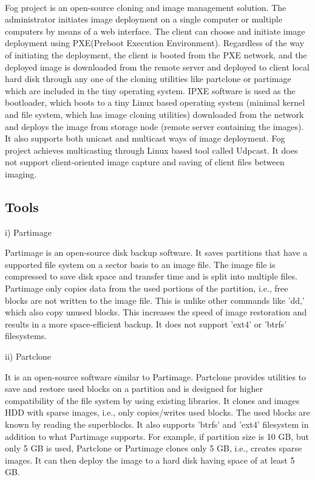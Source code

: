 \documentclass[a4paper,12pt]{article}
\begin{document}
\paragraph{}
Fog project \cite{fogproject} is an open-source cloning and image management solution. The administrator initiates image deployment on a single computer or multiple computers by means of a web interface\cite{wiki}. The client can choose and initiate image deployment using PXE(Preboot Execution Environment)\cite{PXE}. Regardless of the way of initiating the deployment, the client is booted from the PXE network, and the deployed image is downloaded from the remote server and deployed to client local hard disk through any one of the cloning utilities like partclone\cite{Partclone} or partimage\cite{Partimage} which are included in the tiny operating system. IPXE\cite{IPXE} software is used as the bootloader, which boots to a tiny Linux based operating system (minimal kernel and file system, which has image cloning utilities) downloaded from the network and deploys the image from storage node (remote server containing the images). It also supports both unicast and multicast ways of image deployment. Fog project achieves multicasting through Linux based tool called Udpcast. It does not support client-oriented image capture and saving of client files between imaging.

\subsection{Tools}


i) Partimage 

Partimage is an open-source disk backup software. It saves partitions that have a supported file system on a sector basis to an image file. The image file is compressed to save disk space and transfer time and is split into multiple files. Partimage only copies data from the used portions of the partition, i.e., free blocks are not written to the image file. This is unlike other commands like 'dd,' which also copy unused blocks. This increases the speed of image restoration and results in a more space-efficient backup. It does not support 'ext4' or 'btrfs' filesystems.

ii) Partclone 

It is an open-source software similar to Partimage. Partclone provides utilities to save and restore used blocks on a partition and is designed for higher compatibility of the file system by using existing libraries. It clones and images HDD with sparse images, i.e., only copies/writes used blocks. The used blocks are known by reading the superblocks. It also supports 'btrfs' and 'ext4' filesystem in addition to what Partimage supports. 
For example, if partition size is 10 GB, but only 5 GB is used, Partclone or Partimage clones only 5 GB, i.e., creates sparse images. It can then deploy the image to a hard disk having space of at least 5 GB.
\end{document}
